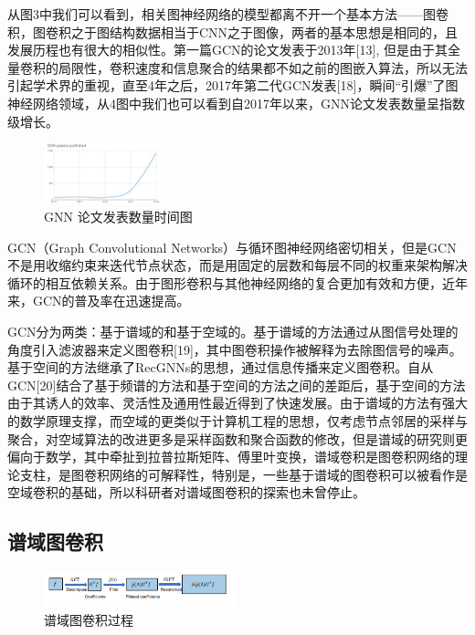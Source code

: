 \documentclass[10pt,journal,compsoc]{IEEEtran}
\begin{document}
从图3中我们可以看到，相关图神经网络的模型都离不开一个基本方法——图卷积，图卷积之于图结构数据相当于CNN之于图像，两者的基本思想是相同的，且发展历程也有很大的相似性。第一篇GCN的论文发表于2013年[13], 但是由于其全量卷积的局限性，卷积速度和信息聚合的结果都不如之前的图嵌入算法，所以无法引起学术界的重视，直至4年之后，2017年第二代GCN发表[18]，瞬间“引爆”了图神经网络领域，从4图中我们也可以看到自2017年以来，GNN论文发表数量呈指数级增长。
\begin{figure}
	\centering
	\includegraphics[width=0.3\textwidth]{2-2}
	\caption{GNN 论文发表数量时间图}
	\label{fig:GNN 论文发表数量时间图}
\end{figure}

GCN（Graph Convolutional Networks）与循环图神经网络密切相关，但是GCN不是用收缩约束来迭代节点状态，而是用固定的层数和每层不同的权重来架构解决循环的相互依赖关系。由于图形卷积与其他神经网络的复合更加有效和方便，近年来，GCN的普及率在迅速提高。


GCN分为两类：基于谱域的和基于空域的。基于谱域的方法通过从图信号处理的角度引入滤波器来定义图卷积[19]，其中图卷积操作被解释为去除图信号的噪声。基于空间的方法继承了RecGNNs的思想，通过信息传播来定义图卷积。自从GCN[20]结合了基于频谱的方法和基于空间的方法之间的差距后，基于空间的方法由于其诱人的效率、灵活性及通用性最近得到了快速发展。由于谱域的方法有强大的数学原理支撑，而空域的更类似于计算机工程的思想，仅考虑节点邻居的采样与聚合，对空域算法的改进更多是采样函数和聚合函数的修改，但是谱域的研究则更偏向于数学，其中牵扯到拉普拉斯矩阵、傅里叶变换，谱域卷积是图卷积网络的理论支柱，是图卷积网络的可解释性，特别是，一些基于谱域的图卷积可以被看作是空域卷积的基础，所以科研者对谱域图卷积的探索也未曾停止。

\subsection{谱域图卷积}

\begin{figure}
	\centering
	\includegraphics[width=0.5\textwidth]{2-3}
	\caption{谱域图卷积过程}
	\label{fig:谱域图卷积过程}
\end{figure}
\end{document}
